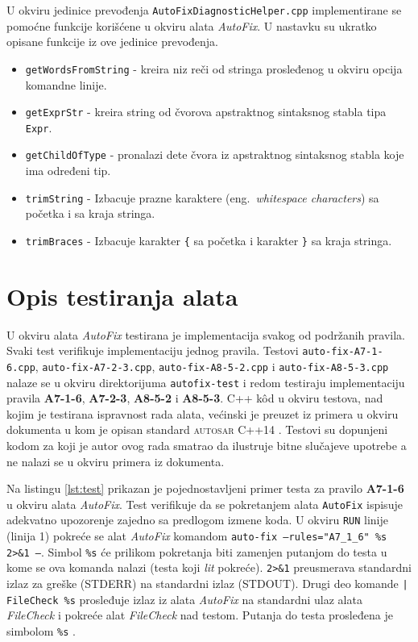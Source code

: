 \documentclass[12pt,oneside]{memoir}
\begin{document}
U okviru jedinice prevođenja \texttt{AutoFixDiagnosticHelper.cpp} implementirane se pomo\'{c}ne funkcije kori\v{s}\'{c}ene u okviru alata \textit{AutoFix}. U nastavku su ukratko opisane funkcije iz ove jedinice prevođenja.
\begin{itemize}
  \item \texttt{getWordsFromString} - kreira niz re\v{c}i od stringa prosleđenog u okviru opcija komandne linije.
  \item \texttt{getExprStr} - kreira string od \v{c}vorova apstraktnog sintaksnog stabla tipa \texttt{Expr}.
  \item \texttt{getChildOfType} - pronalazi dete \v{c}vora iz apstraktnog sintaksnog stabla koje ima određeni tip.
  \item \texttt{trimString} - Izbacuje prazne karaktere (eng.~\textit{whitespace characters}) sa po\v{c}etka i sa kraja stringa.
  \item \texttt{trimBraces} - Izbacuje karakter \texttt{\{} sa po\v{c}etka i karakter \texttt{\}} sa kraja stringa.
\end{itemize}

\section{Opis testiranja alata}

U okviru alata \textit{AutoFix} testirana je implementacija svakog od podr\v{z}anih pravila. Svaki test verifikuje implementaciju jednog pravila.
Testovi \texttt{auto-fix-A7-1-6\-.cpp}, \texttt{auto-fix-A7-2-3.cpp}, \texttt{auto-fix-A8-5-2.cpp} i \texttt{auto-fix-A8-5-3.cpp} nalaze se u okviru direktorijuma \texttt{autofix-test} i redom testiraju implementaciju pravila
\textbf{A7-1-6}, \textbf{A7-2-3}, \textbf{A8-5-2} i \textbf{A8-5-3}. C++ k\^{o}d u okviru testova, nad kojim je testirana ispravnost rada alata, ve\'c{i}nski je preuzet iz primera u okviru dokumenta u kom je opisan standard \textsc{autosar} C++14 \cite{AutosarGuidelines}. Testovi su dopunjeni kodom za koji je autor ovog rada smatrao da ilustruje bitne  slu\v{c}ajeve upotrebe a ne nalazi se u okviru primera iz dokumenta.

Na listingu \ref{lst:test} prikazan je pojednostavljeni primer testa za pravilo \textbf{A7-1-6} u okviru alata \textit{AutoFix}. Test
verifikuje da se pokretanjem alata \texttt{AutoFix} ispisuje adekvatno upozorenje zajedno sa predlogom izmene koda. U okviru \texttt{RUN} linije (linija 1) pokre\'{c}e se alat \textit{AutoFix} komandom \texttt{auto-fix --rules="A7\_1\_6" \%s 2>\&1 --}. Simbol \texttt{\%s}  \'{c}e prilikom pokretanja biti zamenjen putanjom do testa u kome se ova komanda nalazi (testa koji \textit{lit} pokre\'{c}e). \texttt{2>\&1} preusmerava standardni izlaz za gre\v{s}ke (STDERR) na standardni izlaz (STDOUT). Drugi deo komande \texttt{| FileCheck \%s} prosleđuje izlaz iz alata \textit{AutoFix} na standardni ulaz alata \textit{FileCheck} i pokre\'{c}e alat \textit{FileCheck} nad testom. Putanja do testa prosleđena je simbolom \texttt{\%s} \cite{LIT}.
\end{document}

